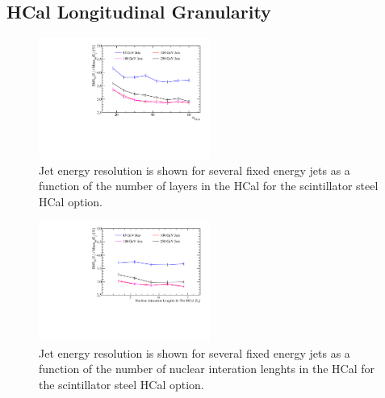 \subsection{HCal Longitudinal Granularity}
\label{optstud:sec:hcal:nlayers}

\begin{figure}
  \includegraphics[width=0.5\textwidth]{OptimisationStudies/Plots/JetEnergyResolutions/JER_vs_NumberOfLayersInTheHCal.pdf}
  \caption[Jet energy resolution as a function of the number of layers in the HCal for the scintillator steel HCal option.]{Jet energy resolution is shown for several fixed energy jets as a function of the number of layers in the HCal for the scintillator steel HCal option.}
  \label{optstud:fig:hcalnlayers}
\end{figure}

\begin{figure}
  \includegraphics[width=0.5\textwidth]{OptimisationStudies/Plots/JetEnergyResolutions/JER_vs_NumberOfNuclearInterationLengthsInTheHCal.pdf}
  \caption[Jet energy resolution as a function of the number of nuclear interaction lengths in the HCal for the scintillator steel HCal option.]{Jet energy resolution is shown for several fixed energy jets as a function of the number of nuclear interation lenghts in the HCal for the scintillator steel HCal option.}
  \label{optstud:fig:hcaldepth}
\end{figure}

